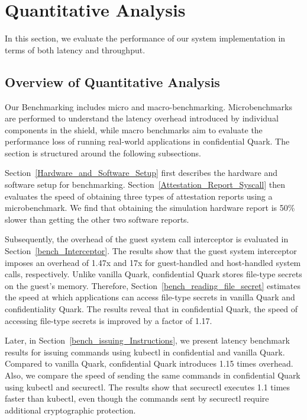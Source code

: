\section{Quantitative Analysis}
\label{sec:eva_Quantitative}
In this section, we evaluate the performance of our system implementation in terms of both latency and throughput.

\subsection{Overview of Quantitative Analysis}

Our Benchmarking includes micro and macro-benchmarking. Microbenchmarks are performed to understand the latency overhead introduced by individual components in the shield, while macro benchmarks aim to evaluate the performance loss of running real-world applications in confidential Quark. 
The section is structured around the following subsections.

Section~\ref{Hardware_and_Software_Setup} first describes the hardware and software setup for benchmarking. Section~\ref{Attestation_Report_Syscall} then evaluates the speed of obtaining three types of attestation reports using a microbenchmark. We find that obtaining the simulation hardware report 
is 50\% slower than getting the other two software reports.

Subsequently, the overhead of the guest system call interceptor is evaluated in Section~\ref{bench_Interceptor}. The results show that the guest system interceptor imposes an overhead of 1.47x and 17x for guest-handled and host-handled system calls, respectively. Unlike vanilla Quark, 
confidential Quark stores file-type secrets on the guest's memory. Therefore, Section~\ref{bench_reading_file_secret} estimates the speed at which applications can access file-type secrets in vanilla Quark and confidentiality Quark. The results reveal that in confidential Quark, the speed of 
accessing file-type secrets is improved by a factor of 1.17.

Later, in Section~\ref{bench_issuing_Instructions}, we present latency benchmark results for issuing commands using kubectl in confidential and vanilla Quark. Compared to vanilla Quark, confidential Quark introduces 1.15 times overhead. Also, we compare the speed of sending the same commands in 
confidential Quark using kubectl and securectl. The results show that securectl executes 1.1 times faster than kubectl, even though the commands sent by securectl require additional cryptographic protection.


